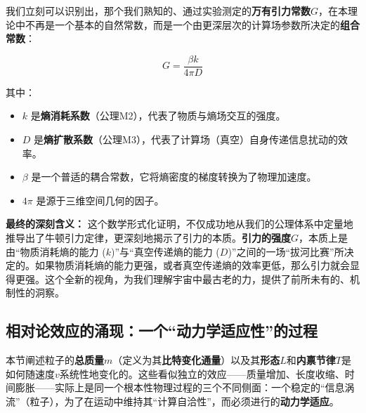 \documentclass[11pt, a4paper]{article}
\begin{document}
我们立刻可以识别出，那个我们熟知的、通过实验测定的\textbf{万有引力常数$G$}，在本理论中不再是一个基本的自然常数，而是一个由更深层次的计算场参数所决定的\textbf{组合常数}：

\[
G = \frac{\beta k}{4\pi D}
\]

其中：
\begin{itemize}
    \item $k$ 是\textbf{熵消耗系数}（公理M2），代表了物质与熵场交互的强度。
    \item $D$ 是\textbf{熵扩散系数}（公理M3），代表了计算场（真空）自身传递信息扰动的效率。
    \item $\beta$ 是一个普适的耦合常数，它将熵密度的梯度转换为了物理加速度。
    \item $4\pi$ 是源于三维空间几何的因子。
\end{itemize}

\textbf{最终的深刻含义：}
这个数学形式化证明，不仅成功地从我们的公理体系中定量地推导出了牛顿引力定律，更深刻地揭示了引力的本质。\textbf{引力的强度$G$}，本质上是由“物质消耗熵的能力 ($k$)”与“真空传递熵的能力 ($D$)”之间的一场“拔河比赛”所决定的。如果物质消耗熵的能力更强，或者真空传递熵的效率更低，那么引力就会显得更强。这个全新的视角，为我们理解宇宙中最古老的力，提供了前所未有的、机制性的洞察。

\subsection{相对论效应的涌现：一个“动力学适应性”的过程}
本节阐述粒子的\textbf{总质量$m$}（定义为其\textbf{比特变化通量}）以及其\textbf{形态$L$}和\textbf{内禀节律$T$}是如何随速度$v$系统性地变化的。这些看似独立的效应——质量增加、长度收缩、时间膨胀——实际上是同一个根本性物理过程的三个不同侧面：一个稳定的“信息涡流”（粒子），为了在运动中维持其“计算自洽性”，而必须进行的\textbf{动力学适应}。
\end{document}
